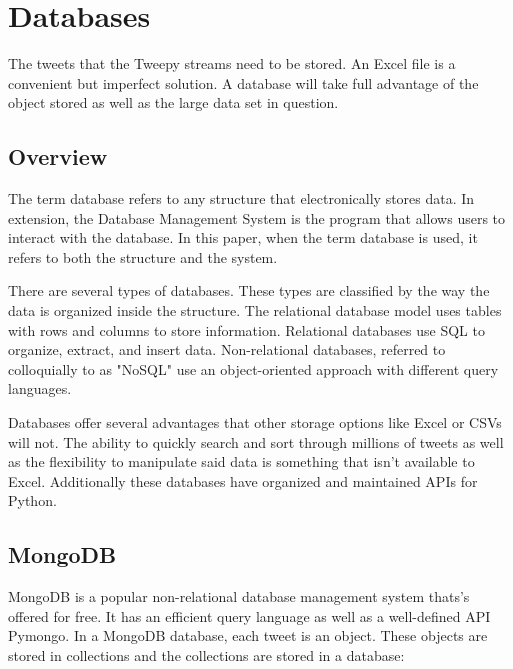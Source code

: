 \documentclass[11pt, twoside, reqno]{book}
\begin{document}
\section{Databases}
\hspace{0.2in} The tweets that the Tweepy streams need to be stored. An Excel file is a convenient but imperfect solution. A database will take full advantage of the object stored as well as the large data set in question. 
\subsection{Overview}
The term database refers to any structure that electronically stores data. In extension, the Database Management System is the program that allows users to interact with the database. In this paper, when the term database is used, it refers to both the structure and the system. 

There are several types of databases. These types are classified by the way the data is organized inside the structure. The relational database model uses tables with rows and columns to store information. Relational databases use SQL to organize, extract, and insert data. Non-relational databases, referred to colloquially to as "NoSQL" use an object-oriented approach with different query languages. 

Databases offer several advantages that other storage options like Excel or CSVs will not. The ability to quickly search and sort through millions of tweets as well as the flexibility to manipulate said data is something that isn't available to Excel. Additionally these databases have organized and maintained APIs for Python. 

\subsection{MongoDB}
\hspace{0.2in} MongoDB is a popular non-relational database management system thats's offered for free. It has an efficient query language as well as a well-defined API Pymongo. In a MongoDB database, each tweet is an object. These objects are stored in collections and the collections are stored in a database:
\end{document}
